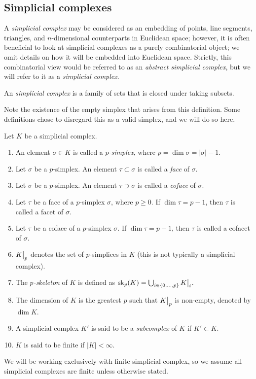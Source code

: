 \subsection{Simplicial complexes}

A \emph{simplicial complex} may be considered as an embedding of points, line segments, triangles, and $n$-dimensional counterparts in Euclidean space; however, it is often beneficial to look at simplicial complexes as a purely combinatorial object; we omit details on how it will be embedded into Euclidean space. Strictly, this combinatorial view would be referred to as an \emph{abstract simplicial complex}, but we will refer to it as a \emph{simplicial complex}.

\begin{definition}
    An \emph{simplicial complex} is a family of sets that is closed under taking subsets.
\end{definition}

Note the existence of the empty simplex that arises from this definition. Some definitions chose to disregard this as a valid simplex, and we will do so here.

\begin{definition}
    Let $K$ be a simplicial complex.
    \begin{enumerate}
        \item An element $\sigma \in K$ is called a \emph{$p$-simplex}, where $p = \dim\sigma = \lvert \sigma \rvert - 1$.
        \item Let $\sigma$ be a $p$-simplex. An element $\tau \subset \sigma$ is called a \emph{face} of $\sigma$.
        \item Let $\sigma$ be a $p$-simplex. An element $\tau \supset \sigma$ is called a \emph{coface} of $\sigma$.
        \item Let $\tau$ be a face of a $p$-simplex $\sigma$, where $p \geq 0$. If $\dim\tau = p-1$, then $\tau$ is called a facet of $\sigma$.
        \item Let $\tau$ be a coface of a $p$-simplex $\sigma$. If $\dim\tau = p+1$, then $\tau$ is called a cofacet of $\sigma$.
        \item $\restr Kp$ denotes the set of $p$-simplices in $K$ (this is not typically a simplicial complex).
        \item The \emph{$p$-skeleton} of $K$ is defined as $\sk_p(K) = \bigcup_{i \in \{0, \ldots, p\}} \restr Ki$.
        \item The dimension of $K$ is the greatest $p$ such that $\restr Kp$ is non-empty, denoted by $\dim K$.
        \item A simplicial complex $K'$ is said to be a \emph{subcomplex} of $K$ if $K' \subset K$.
        \item $K$ is said to be finite if $\lvert K \rvert < \infty$.
    \end{enumerate}
\end{definition}
We will be working exclusively with finite simplicial complex, so we assume all simplicial complexes are finite unless otherwise stated.

